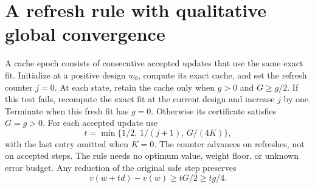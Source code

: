 \documentclass[11pt]{article}
\begin{document}
\section{A refresh rule with qualitative global convergence}
A cache epoch consists of consecutive accepted updates that use the same exact fit. Initialize at a positive design $w_0$, compute its exact cache, and set the refresh counter $j=0$. At each state, retain the cache only when $g>0$ and $G\ge g/2$. If this test fails, recompute the exact fit at the current design and increase $j$ by one. Terminate when this fresh fit has $g=0$. Otherwise its certificate satisfies $G=g>0$. For each accepted update use
\begin{equation}\label{eq:capped}
 t=\min\{1/2,\,1/(j+1),\,G/(4K)\},
\end{equation}
with the last entry omitted when $K=0$. The counter advances on refreshes, not on accepted steps. The rule needs no optimum value, weight floor, or unknown error budget. Any reduction of the original safe step preserves
\begin{equation}\label{eq:margin-gain}
 v(w+td)-v(w)\ge tG/2\ge tg/4.
\end{equation}
\end{document}
